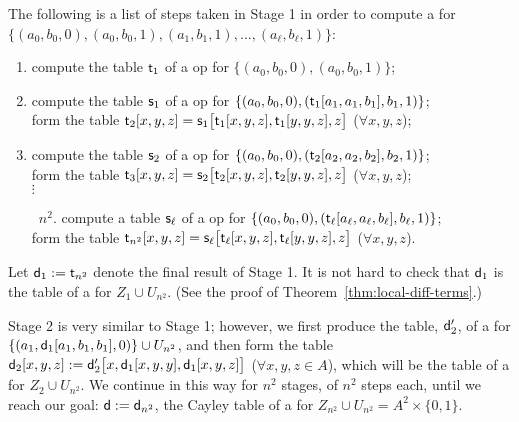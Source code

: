 The following is a list of steps taken in Stage 1 in order to compute a \ldto for
$\{(a_0, b_0,0),(a_0, b_0,1),(a_1, b_1,1), \dots, (a_{\ell}, b_{\ell},1)\}$:
\begin{enumerate}[1.]
  \item compute the table $\mathsf{t}_1$ of a \ldt op for $\{(a_0, b_0, 0), (a_0, b_0, 1)\}$;\\[-8pt]
  \item compute the table $\mathsf{s}_1$ of a \ldt op for $\{(a_0, b_0, 0), (\mathsf{t}_1[a_1, a_1, b_1], b_1, 1)\}$; \\
  form the table $\mathsf{t}_2[x,y,z] = \mathsf{s}_1\bigl[\mathsf{t}_1[x,y,z], \mathsf{t}_1[y,y,z], z\bigr]$
  ($\forall x,y,z$);
  \\[-8pt]
  \item compute the table $\mathsf{s}_2$ of a \ldt op for $\{(a_0, b_0, 0), (\mathsf{t}_2[a_2, a_2, b_2], b_2, 1)\}$; \\
    form the table $\mathsf{t}_3[x,y,z] = \mathsf{s}_2\bigl[\mathsf{t}_2[x,y,z], \mathsf{t}_2[y,y,z], z\bigr]$  ($\forall x,y,z$);\\
  $\vdots$
  \item[~\hskip-5mm$n^2$\!.] compute a table $\mathsf{s}_{\ell}$ of a \ldt op for $\{(a_0, b_0, 0),  (\mathsf{t}_{\ell}[a_{\ell}, a_{\ell}, b_{\ell}], b_{\ell}, 1)\}$; \\
  form the table $\mathsf{t}_{n^2}[x,y,z] = \mathsf{s}_{\ell}\bigl[\mathsf{t}_{\ell}[x,y,z], \mathsf{t}_{\ell}[y,y,z], z\bigr]$
  ($\forall x,y,z$).
\end{enumerate}
Let $\mathsf{d}_1 := \mathsf{t}_{n^2}$ denote the final result of Stage 1. It is not hard to check that
$\mathsf{d}_1$ is the table of a \ldto for $Z_1 \cup U_{n^2}$. (See the proof of Theorem~\ref{thm:local-diff-terms}.)

Stage 2 is very similar to Stage 1; however, we first produce the table, $\mathsf{d}'_2$, of a \ldto for
$\{(a_1, \mathsf{d}_1[a_1, b_1, b_1], 0)\} \cup U_{n^2}$, and then form the table
$\mathsf{d}_2[x,y,z] := \mathsf{d}'_2\bigl[x, \mathsf{d}_1[x,y,y], \mathsf{d}_1[x,y,z]\bigr]$ ($\forall x,y,z \in A$),
which will be the table of a \ldto for $Z_2 \cup U_{n^2}$.
We continue in this way for $n^2$ stages, of $n^2$ steps each, until we reach
our goal: $\mathsf{d}:=\mathsf{d}_{n^2}$, the Cayley table of
a \ldto for $Z_{n^2} \cup U_{n^2} = A^2 \times \{0,1\}$.

